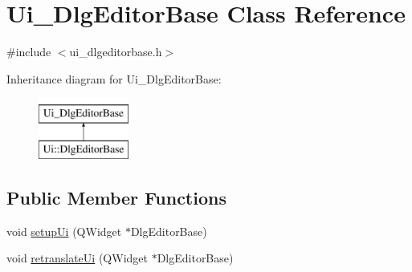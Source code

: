 \hypertarget{classUi__DlgEditorBase}{\section{Ui\+\_\+\+Dlg\+Editor\+Base Class Reference}
\label{classUi__DlgEditorBase}
}


{\ttfamily \#include $<$ui\+\_\+dlgeditorbase.\+h$>$}

Inheritance diagram for Ui\+\_\+\+Dlg\+Editor\+Base\+:\begin{figure}[H]
\begin{center}
\leavevmode
\includegraphics[height=2.000000cm]{classUi__DlgEditorBase}
\end{center}
\end{figure}
\subsection*{Public Member Functions}
\begin{DoxyCompactItemize}
\item 
void \hyperlink{classUi__DlgEditorBase_a5b23b644a6d5dd91f606e93e6f324960}{setup\+Ui} (Q\+Widget $\ast$Dlg\+Editor\+Base)
\item 
void \hyperlink{classUi__DlgEditorBase_abc814990c59a23d17a7234a7a4cf2896}{retranslate\+Ui} (Q\+Widget $\ast$Dlg\+Editor\+Base)
\end{DoxyCompactItemize}
